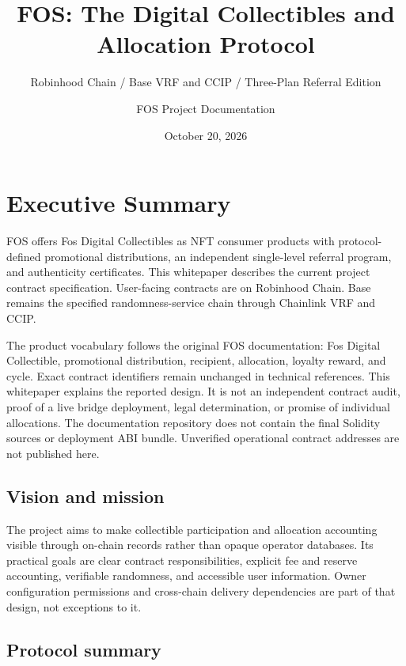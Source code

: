 \documentclass[
  10pt,
  letterpaper,
]{article}
\title{FOS: The Digital Collectibles and Allocation Protocol}
\subtitle{Robinhood Chain / Base VRF and CCIP / Three-Plan Referral
Edition}
\author{FOS Project Documentation}
\date{October 20, 2026}
\begin{document}
\maketitle

{
\hypersetup{linkcolor=}
\setcounter{tocdepth}{1}
\tableofcontents
\clearpage
}
\section{Executive Summary}\label{executive-summary}

FOS offers Fos Digital Collectibles as NFT consumer products with
protocol-defined promotional distributions, an independent single-level
referral program, and authenticity certificates. This whitepaper
describes the current project contract specification. User-facing
contracts are on Robinhood Chain. Base remains the specified
randomness-service chain through Chainlink VRF and CCIP.

The product vocabulary follows the original FOS documentation: Fos
Digital Collectible, promotional distribution, recipient, allocation,
loyalty reward, and cycle. Exact contract identifiers remain unchanged
in technical references. This whitepaper explains the reported design.
It is not an independent contract audit, proof of a live bridge
deployment, legal determination, or promise of individual allocations.
The documentation repository does not contain the final Solidity sources
or deployment ABI bundle. Unverified operational contract addresses are
not published here.

\subsection{Vision and mission}\label{vision-and-mission}

The project aims to make collectible participation and allocation
accounting visible through on-chain records rather than opaque operator
databases. Its practical goals are clear contract responsibilities,
explicit fee and reserve accounting, verifiable randomness, and
accessible user information. Owner configuration permissions and
cross-chain delivery dependencies are part of that design, not
exceptions to it.

\subsection{Protocol summary}\label{protocol-summary}
\end{document}
